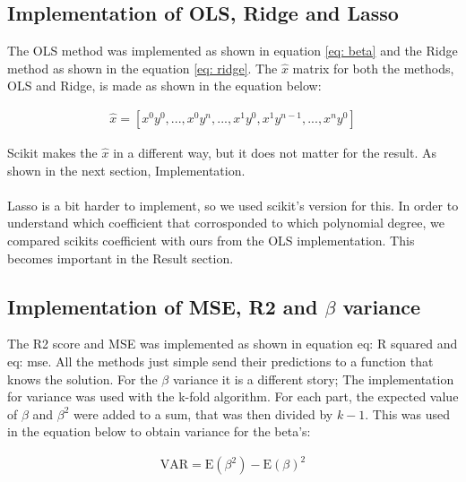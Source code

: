 \subsection{Implementation of OLS, Ridge and Lasso}

The OLS method was implemented as shown in equation \ref{eq: beta} and the Ridge
method as shown in the equation \ref{eq: ridge}. The $\hat{x}$ matrix
for both the methods, OLS and Ridge, is made as shown in the equation below:

\begin{align*}
    \hat{x} = [x^0y^0,...,x^0y^n,...,x^1y^0,x^1y^{n-1},...,x^ny^0]
\end{align*}

Scikit makes the $\hat{x}$ in a different way, but it does not matter for the result.
As shown in the next section, Implementation.
\\
\\
Lasso is a bit harder to implement, so we used scikit's version for this.
In order to understand which coefficient that corrosponded to which polynomial degree,
we compared scikits coefficient with ours from the OLS implementation. This becomes important in
the Result section.

\subsection{Implementation of MSE, R2 and $\beta$ variance}

The R2 score and MSE was implemented as shown in equation {eq: R squared} and {eq: mse}.
All the methods just simple send their predictions to a function that knows the solution.
For the $\beta$ variance it is a different story; The implementation for variance was used with the k-fold algorithm.
For each part, the expected value of $\beta$ and $\beta^2$ were added to a sum, that was then divided by
$k-1$. This was used in the equation below to obtain variance for the beta's:

\begin{align*}
    \text{VAR} = \text{E}(\beta^2) - \text{E}(\beta)^2
\end{align*}
